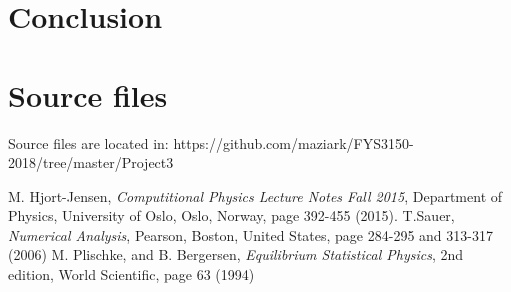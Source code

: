 \documentclass{article}
\begin{document}
\section{Conclusion}




\section{Source files}

Source files are located in:
\newline
https://github.com/maziark/FYS3150-2018/tree/master/Project3
\newline\newline


\begin{thebibliography}{99}
 M. Hjort-Jensen, \textit{Computitional Physics Lecture Notes Fall 2015}, Department of Physics, University of Oslo, Oslo, Norway, page 392-455 (2015).
 T.Sauer, \textit{Numerical Analysis}, Pearson, Boston, United States, page 284-295 and 313-317 (2006)
 M. Plischke, and B. Bergersen, \textit{Equilibrium Statistical Physics}, 2nd edition, World Scientific, page 63 (1994)
\end{thebibliography}
\end{document}
